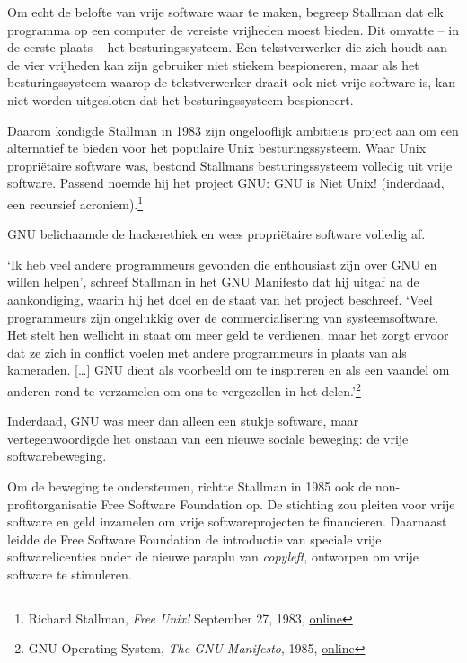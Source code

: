 \documentclass[
  a5paper,
  smalldemyvopaper,11pt,twoside,onecolumn,openright,extrafontsizes,
hidelinks]{memoir}
\begin{document}
Om echt de belofte van vrije software waar te maken, begreep Stallman
dat elk programma op een computer de vereiste vrijheden moest bieden.
Dit omvatte -- in de eerste plaats -- het besturingssysteem. Een
tekstverwerker die zich houdt aan de vier vrijheden kan zijn gebruiker
niet stiekem bespioneren, maar als het besturingssysteem waarop de
tekstverwerker draait ook niet-vrije software is, kan niet worden
uitgesloten dat het besturingssysteem bespioneert.

Daarom kondigde Stallman in 1983 zijn ongelooflijk ambitieus project aan
om een alternatief te bieden voor het populaire Unix besturingssysteem.
Waar Unix propriëtaire software was, bestond Stallmans besturingssysteem
volledig uit vrije software. Passend noemde hij het project GNU: GNU is
Niet Unix! (inderdaad, een recursief acroniem).\footnote{\hspace{0pt}Richard
  Stallman, \emph{Free Unix!} September 27, 1983,
  \href{https://www.gnu.org/gnu/initial-announcement.en.html.}{online}}

GNU belichaamde de hackerethiek en wees propriëtaire software volledig
af.

`Ik heb veel andere programmeurs gevonden die enthousiast zijn over GNU
en willen helpen', schreef Stallman in het GNU Manifesto dat hij uitgaf
na de aankondiging, waarin hij het doel en de staat van het project
beschreef. `Veel programmeurs zijn ongelukkig over de commercialisering
van systeemsoftware. Het stelt hen wellicht in staat om meer geld te
verdienen, maar het zorgt ervoor dat ze zich in conflict voelen met
andere programmeurs in plaats van als kameraden. {[}\ldots{]} GNU dient
als voorbeeld om te inspireren en als een vaandel om anderen rond te
verzamelen om ons te vergezellen in het delen.'\footnote{\hspace{0pt}GNU
  Operating System, \emph{The GNU Manifesto}, 1985,
  \href{https://www.gnu.org/gnu/manifesto.html.en}{online}}

Inderdaad, GNU was meer dan alleen een stukje software, maar
vertegenwoordigde het onstaan van een nieuwe sociale beweging: de vrije
softwarebeweging.

Om de beweging te ondersteunen, richtte Stallman in 1985 ook de
non-profitorganisatie Free Software Foundation op. De stichting zou
pleiten voor vrije software en geld inzamelen om vrije softwareprojecten
te financieren. Daarnaast leidde de Free Software Foundation de
introductie van speciale vrije softwarelicenties onder de nieuwe paraplu
van \emph{copyleft}, ontworpen om vrije software te stimuleren.
\end{document}
